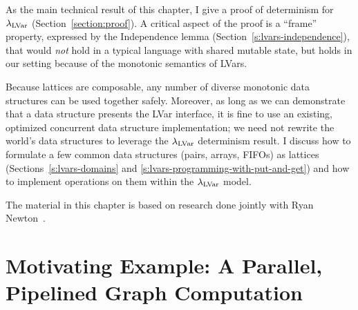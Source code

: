 As the main technical result of this chapter, I give a proof of
determinism for $\lambda_{\textrm{LVar}}$ (Section~\ref{section:proof}).  A
critical aspect of the proof is a ``frame'' property, expressed by the
Independence lemma (Section~\ref{s:lvars-independence}), that would
{\em not} hold in a typical language with shared mutable state, but
holds in our setting because of the monotonic semantics of LVars.

Because lattices are composable, any number of diverse monotonic data
structures can be used together safely.  Moreover, as long as we can
demonstrate that a data structure presents the LVar interface, it is
fine to use an existing, optimized concurrent data structure
implementation; we need not rewrite the world's data structures to
leverage the $\lambda_{\textrm{LVar}}$ determinism result. I discuss how to
formulate a few common data structures (pairs, arrays, FIFOs) as
lattices (Sections~\ref{s:lvars-domains} and
\ref{s:lvars-programming-with-put-and-get}) and how to implement
operations on them within the $\lambda_{\textrm{LVar}}$ model.

The material in this chapter is based on research done jointly with
Ryan Newton~\cite{LVars-paper, LVars-tr}.



\section{Motivating Example: A Parallel, Pipelined Graph Computation}\label{section:motivation}


